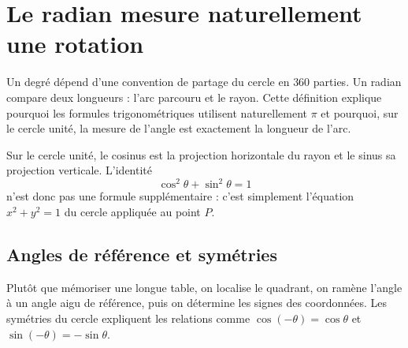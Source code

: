 \documentclass[12pt,a4paper,openany]{book}
\begin{document}
\section{Le radian mesure naturellement une rotation}

\begin{visualbox}
Un degré dépend d'une convention de partage du cercle en $360$ parties. Un radian compare deux longueurs : l'arc parcouru et le rayon. Cette définition explique pourquoi les formules trigonométriques utilisent naturellement $\pi$ et pourquoi, sur le cercle unité, la mesure de l'angle est exactement la longueur de l'arc.
\end{visualbox}

\begin{center}
\qquad
{}
\end{center}

\begin{connectionbox}
Sur le cercle unité, le cosinus est la projection horizontale du rayon et le sinus sa projection verticale. L'identité
\[
\cos^2\theta+\sin^2\theta=1
\]
n'est donc pas une formule supplémentaire : c'est simplement l'équation $x^2+y^2=1$ du cercle appliquée au point $P$.
\end{connectionbox}

\subsection{Angles de référence et symétries}
Plutôt que mémoriser une longue table, on localise le quadrant, on ramène l'angle à un angle aigu de référence, puis on détermine les signes des coordonnées. Les symétries du cercle expliquent les relations comme $\cos(-\theta)=\cos\theta$ et $\sin(-\theta)=-\sin\theta$.
\end{document}
